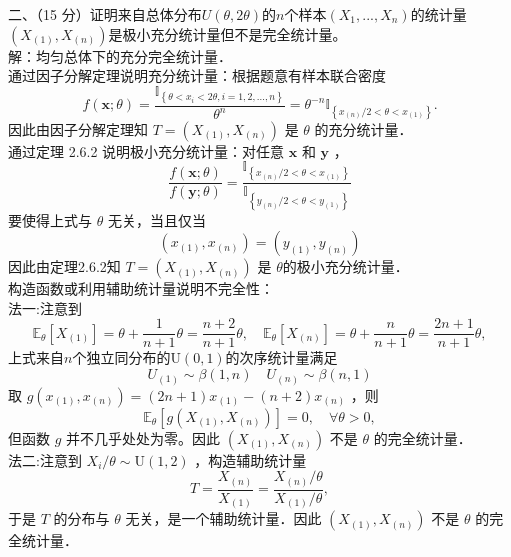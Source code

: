 \documentclass[UTF8,openany]{book}
\begin{document}
	
	
	\noindent 二、（15 分）证明来自总体分布$U(\theta, 2\theta)$的$n$个样本$(X_1,...,X_n)$的统计量$(X_{(1)}, X_{(n)})$是极小充分统计量但不是完全统计量。\\
	解：均匀总体下的充分完全统计量．\\
	通过因子分解定理说明充分统计量：根据题意有样本联合密度
	$$
	f(\boldsymbol{x} ; \theta)=\frac{\mathbb{I}_{\left\{\theta<x_i<2 \theta, i=1,2, \ldots, n\right\}}}{\theta^n}=\theta^{-n} \mathbb{I}_{\left\{x_{(n)} / 2<\theta<x_{(1)}\right\}} .
	$$
	因此由因子分解定理知 $T=\left( X_{(1)}, X_{(n)}\right) $ 是 $\theta$ 的充分统计量．\\
	通过定理 2.6.2 说明极小充分统计量：对任意 $\boldsymbol{x}$ 和 $\boldsymbol{y}$ ，
	$$
	\frac{f(\boldsymbol{x} ; \theta)}{f(\boldsymbol{y} ; \theta)}=\frac{\mathbb{I}_{\left\{x_{(n)} / 2<\theta<x_{(1)}\right\}}}{\mathbb{I}_{\left\{y_{(n)} / 2<\theta<y_{(1)}\right\}}}
	$$
	要使得上式与 $\theta$ 无关，当且仅当 $$\left(x_{(1)}, x_{(n)}\right)=\left(y_{(1)}, y_{(n)}\right)$$
	因此由定理2.6.2知 $T=\left(X_{(1)}, X_{(n)}\right)$ 是 $\theta$的极小充分统计量．\\
	构造函数或利用辅助统计量说明不完全性：\\
	法一:注意到
	$$
	\mathbb{E}_\theta\left[X_{(1)}\right]=\theta+\frac{1}{n+1} \theta=\frac{n+2}{n+1} \theta, \quad \mathbb{E}_\theta\left[X_{(n)}\right]=\theta+\frac{n}{n+1} \theta=\frac{2 n+1}{n+1} \theta,
	$$
	上式来自$n$个独立同分布的$\mathrm{U}(0,1)$的次序统计量满足
	\[
	U_{(1)}\sim \beta(1,n) \quad U_{(n)}\sim \beta(n,1)
	\]
	取 $g\left(x_{(1)}, x_{(n)}\right)=(2 n+1) x_{(1)}-(n+2) x_{(n)}$ ，则
	$$
	\mathbb{E}_\theta\left[g\left(X_{(1)}, X_{(n)}\right)\right]=0, \quad \forall \theta>0,
	$$
	但函数 $g$ 并不几乎处处为零。因此 $\left(X_{(1)}, X_{(n)}\right)$ 不是 $\theta$ 的完全统计量．\\
	法二:注意到 $X_i / \theta \sim \mathrm{U}(1,2)$ ，构造辅助统计量
	$$
	T=\frac{X_{(n)}}{X_{(1)}}=\frac{X_{(n)} / \theta}{X_{(1)} / \theta},
	$$
	于是 $T$ 的分布与 $\theta$ 无关，是一个辅助统计量．因此 $\left(X_{(1)}, X_{(n)}\right)$ 不是 $\theta$ 的完全统计量．\\
	
	
	
	
	
\end{document}
